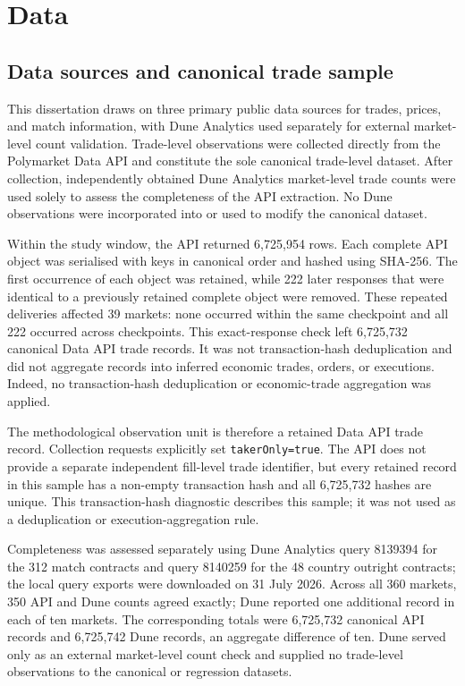 
\section{Data}
\label{sec:data}

\subsection{Data sources and canonical trade sample}

This dissertation draws on three primary public data sources for trades,
prices, and match information, with Dune Analytics used separately for external
market-level count validation. Trade-level observations were collected directly from
the Polymarket Data API and constitute the sole canonical trade-level dataset.
After collection, independently obtained Dune Analytics market-level trade
counts were used solely to assess the completeness of the API extraction. No
Dune observations were incorporated into or used to modify the canonical
dataset.

Within the study window, the API returned 6,725,954 rows. Each complete API
object was serialised with keys in canonical order and hashed using SHA-256.
The first occurrence of each object was retained, while 222 later responses
that were identical to a previously retained complete object were removed.
These repeated deliveries affected 39 markets: none occurred within the same
checkpoint and all 222 occurred across checkpoints. This exact-response check
left 6,725,732 canonical Data API trade records. It was not transaction-hash
deduplication and did not aggregate records into inferred economic trades,
orders, or executions. Indeed, no transaction-hash deduplication or
economic-trade aggregation was applied.

The methodological observation unit is therefore a retained Data API trade
record. Collection requests explicitly set \texttt{takerOnly=true}. The API
does not provide a separate independent fill-level trade identifier, but every
retained record in this sample has a non-empty transaction hash and all
6,725,732 hashes are unique. This transaction-hash diagnostic describes this
sample; it was not used as a deduplication or execution-aggregation rule.

Completeness was assessed separately using Dune Analytics query 8139394 for
the 312 match contracts and query 8140259 for the 48 country outright
contracts; the local query exports were downloaded on 31 July 2026. Across all
360 markets, 350 API and Dune counts agreed exactly;
Dune reported one additional record in each of ten markets. The corresponding
totals were 6,725,732 canonical API records and 6,725,742 Dune records, an
aggregate difference of ten. Dune served only as an external market-level
count check and supplied no trade-level observations to the canonical or
regression datasets.

